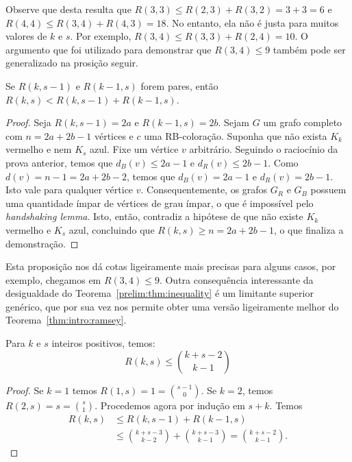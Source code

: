 Observe que desta resulta que $R(3,3) \leq R(2,3) + R(3,2) = 3 + 3 = 6$ e $R(4,4) \leq R(3,4) + R(4,3) = 18$. No entanto, ela não é justa para muitos valores de $k$ e $s$. Por exemplo, $R(3,4) \leq R(3,3) + R(2,4) = 10$. O argumento que foi utilizado para demonstrar que $R(3,4) \leq 9$ também pode ser generalizado na prosição seguir.

\begin{theorem}
\label{prelim:thm:parity}
Se $R(k,s-1)$ e $R(k-1,s)$ forem pares, então
$R(k,s) < R(k,s-1) + R(k-1,s)$.
\end{theorem}
\begin{proof}
Seja $R(k,s-1) = 2a$ e $R(k-1,s) = 2b$.
Sejam $G$ um grafo completo com $n = 2a + 2b -1$ vértices e $c$ uma RB-coloração. Suponha que não exista $K_k$ vermelho e nem $K_s$ azul. Fixe um vértice $v$ arbitrário. Seguindo o raciocínio da prova anterior, temos que $d_B(v) \leq 2a - 1$ e $d_R(v) \leq 2b - 1$. Como $d(v) = n - 1 = 2a + 2b - 2$, temos que $d_B(v) = 2a - 1$ e $d_R(v) = 2b - 1$. Isto vale para qualquer vértice $v$.
Consequentemente, os grafos $G_R$ e $G_B$ possuem uma quantidade ímpar de vértices de grau ímpar, o que é impossível pelo \emph{handshaking lemma}. Isto, então, contradiz a hipótese de que não existe $K_k$ vermelho e $K_s$ azul, concluindo que $R(k,s) \geq n = 2a + 2b -1$, o que finaliza a demonstração.
\end{proof}

Esta proposição nos dá cotas ligeiramente mais precisas para alguns casos, por exemplo, chegamos em $R(3,4) \leq 9$. Outra consequência interessante da desigualdade do Teorema~\ref{prelim:thm:inequality} é um limitante superior genérico, que por sua vez nos permite obter uma versão ligeiramente melhor do Teorema~\ref{thm:intro:ramsey}.

\begin{theorem}
\label{thm:szekeres}
Para $k$ e $s$ inteiros positivos, temos:
\[R(k,s) \leq \binom{k + s - 2}{k - 1}\]
\end{theorem}
\begin{proof}
Se $k = 1$ temos $R(1,s) = 1 = \binom{s - 1}{0}$. Se $k = 2$, temos $R(2,s) = s = \binom{s}{1}$. Procedemos agora por indução em $s + k$. Temos
\begin{align*}
  R(k,s) &\leq R(k,s-1) + R(k-1,s) \\
  &\leq \binom{k + s - 3}{k - 2} + \binom{k + s - 3}{k - 1} = \binom{k + s - 2}{k - 1}.
\end{align*}
\end{proof}

